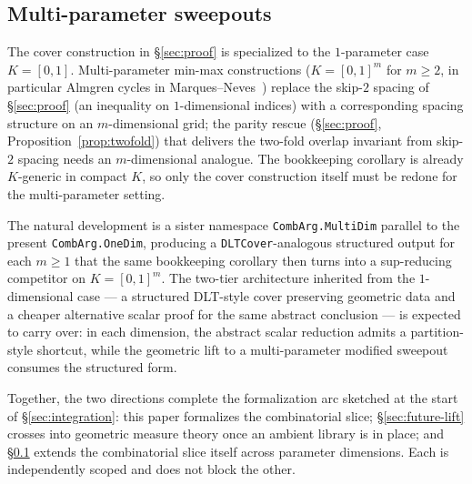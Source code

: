 \subsection{Multi-parameter sweepouts}
\label{sec:future-multiparam}

The cover construction in \S\ref{sec:proof} is specialized to the
$1$-parameter case $K = [0,1]$. Multi-parameter min-max
constructions ($K = [0,1]^m$ for $m \ge 2$, in particular Almgren
cycles in Marques--Neves~\cite{MN14}) replace the skip-$2$ spacing
of \S\ref{sec:proof} (an inequality on $1$-dimensional indices)
with a corresponding spacing structure on an $m$-dimensional grid;
the parity rescue (\S\ref{sec:proof}, Proposition~\ref{prop:twofold})
that delivers the two-fold overlap invariant from skip-$2$ spacing
needs an $m$-dimensional analogue. The bookkeeping corollary
 is already
$K$-generic in compact $K$, so only the cover construction itself
must be redone for the multi-parameter setting.

The natural development is a sister namespace
\texttt{CombArg.MultiDim} parallel to the present
\texttt{CombArg.OneDim}, producing a \texttt{DLTCover}-analogous
structured output for each $m \ge 1$ that the same bookkeeping
corollary then turns into a sup-reducing competitor on $K =
[0,1]^m$. The two-tier architecture inherited from the
$1$-dimensional case --- a structured DLT-style cover preserving
geometric data and a cheaper alternative scalar proof for the same
abstract conclusion --- is expected to carry over: in each
dimension, the abstract scalar reduction admits a partition-style
shortcut, while the geometric lift to a multi-parameter modified
sweepout consumes the structured form.

\medskip

Together, the two directions complete the formalization arc
sketched at the start of \S\ref{sec:integration}: this paper
formalizes the combinatorial slice; \S\ref{sec:future-lift} crosses
into geometric measure theory once an ambient library is in place;
and \S\ref{sec:future-multiparam} extends the combinatorial slice
itself across parameter dimensions. Each is independently scoped and
does not block the other.
